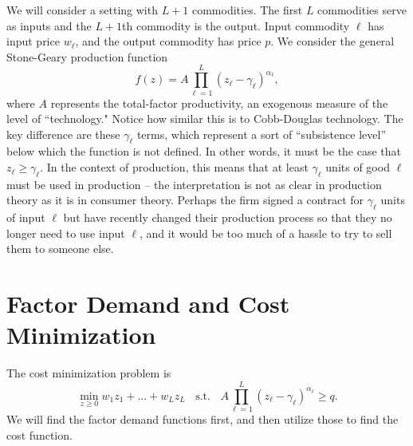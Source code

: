 \documentclass[12pt]{article}
\theoremstyle{definition}
\begin{document}
\maketitle
\onehalfspace


We will consider a setting with $L+1$ commodities. The first $L$ commodities serve as inputs and the $L+1$th commodity is the output. Input commodity $\ell$ has input price $w_{\ell}$, and the output commodity has price $p$. We consider the general Stone-Geary production function
	\[	f(z)=A \prod_{{\ell}=1}^L (z_{\ell} - \gamma_{\ell})^{\alpha_{\ell}},\]
where $A$ represents the total-factor productivity, an exogenous measure of the level of ``technology." Notice how similar this is to Cobb-Douglas technology. The key difference are these $\gamma_{\ell}$ terms, which represent a sort of ``subsistence level'' below which the function is not defined.  In other words, it must be the case that $z_{\ell} \geq \gamma_{\ell}$. In the context of production, this means that at least $\gamma_{\ell}$ units of good ${\ell}$ must be used in production -- the interpretation is not as clear in production theory as it is in consumer theory. Perhaps the firm signed a contract for $\gamma_{\ell}$ units of input ${\ell}$ but have recently changed their production process so that they no longer need to use input $\ell$, and it would be too much of a hassle to try to sell them to someone else.



\section{Factor Demand and Cost Minimization}
The cost minimization problem is
	\[	\min_{z \geq 0} w_1z_1 + ... + w_{L}z_{L}  \;\; \text{ s.t. } \;\; A \prod_{\ell = 1}^{L} (z_{\ell} - \gamma_{\ell})^{\alpha_{\ell}} \geq q. \]	
We will find the factor demand functions first, and then utilize those to find the cost function. 
	

	
\end{document}

